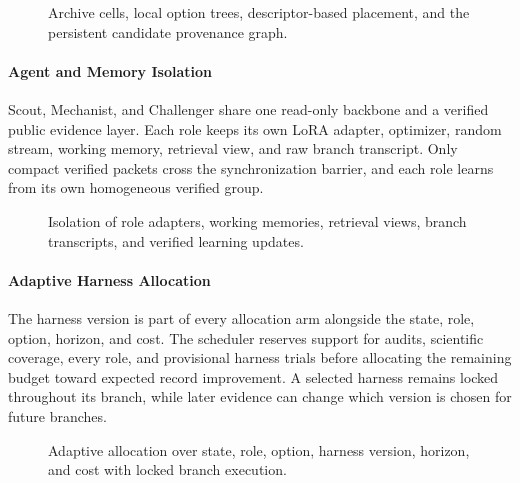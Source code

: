 \begin{figure}[!htbp]
\centering
\resizebox{\linewidth}{!}{}
\caption{Archive cells, local option trees, descriptor-based placement, and the persistent candidate provenance graph.}
\label{figarchiveprovenance}
\end{figure}

\clearpage

\paragraph{Agent and Memory Isolation}
Scout, Mechanist, and Challenger share one read-only backbone and a verified public evidence layer. Each role keeps its own LoRA adapter, optimizer, random stream, working memory, retrieval view, and raw branch transcript. Only compact verified packets cross the synchronization barrier, and each role learns from its own homogeneous verified group.

\begin{figure}[!htbp]
\centering
\resizebox{\linewidth}{!}{}
\caption{Isolation of role adapters, working memories, retrieval views, branch transcripts, and verified learning updates.}
\label{figagentisolation}
\end{figure}

\clearpage

\paragraph{Adaptive Harness Allocation}
The harness version is part of every allocation arm alongside the state, role, option, horizon, and cost. The scheduler reserves support for audits, scientific coverage, every role, and provisional harness trials before allocating the remaining budget toward expected record improvement. A selected harness remains locked throughout its branch, while later evidence can change which version is chosen for future branches.

\begin{figure}[!htbp]
\centering
\resizebox{\linewidth}{!}{}
\caption{Adaptive allocation over state, role, option, harness version, horizon, and cost with locked branch execution.}
\label{figharnessallocation}
\end{figure}

\clearpage

